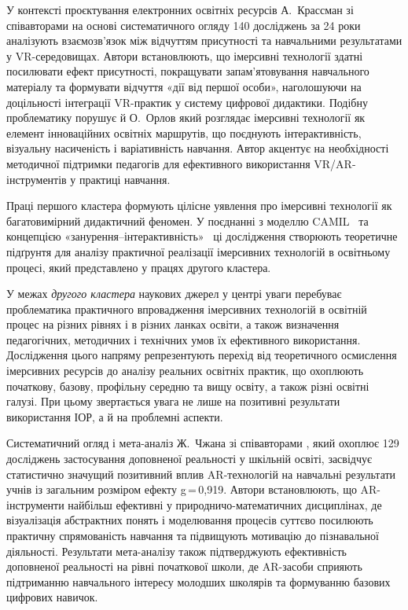 У контексті проєктування електронних освітніх ресурсів А.~Крассман зі співавторами \cite{Chornous2025Presence} на основі систематичного огляду 140 досліджень за 24 роки аналізують взаємозв'язок між відчуттям присутності та навчальними результатами у VR-середовищах. Автори встановлюють, що імерсивні технології здатні посилювати ефект присутності, покращувати запам'ятовування навчального матеріалу та формувати відчуття «дії від першої особи», наголошуючи на доцільності інтеграції VR-практик у систему цифрової дидактики. Подібну проблематику порушує й О.~Орлов \cite{Orlov2024Innovative} який розглядає імерсивні технології як елемент інноваційних освітніх маршрутів, що поєднують інтерактивність, візуальну насиченість і варіативність навчання. Автор акцентує на необхідності методичної підтримки педагогів для ефективного використання VR/AR-інструментів у практиці навчання.

Праці першого кластера формують цілісне уявлення про імерсивні технології як багатовимірний дидактичний феномен. У поєднанні з моделлю CAMIL~\cite{Makransky2021CAMIL} та концепцією «занурення--інтерактивність»~\cite{Klingenberg2024Embodiment} ці дослідження створюють теоретичне підґрунтя для аналізу практичної реалізації імерсивних технологій в освітньому процесі, який представлено у працях другого кластера.


У межах \emph{другого кластера} наукових джерел у центрі уваги перебуває проблематика практичного впровадження імерсивних технологій в освітній процес на різних рівнях і в різних ланках освіти, а також визначення педагогічних, методичних і технічних умов їх ефективного використання. Дослідження цього напряму репрезентують перехід від теоретичного осмислення імерсивних ресурсів до аналізу реальних освітніх практик, що охоплюють початкову, базову, профільну середню та вищу освіту, а також різні освітні галузі. При цьому звертається увага не лише на позитивні результати використання ІОР, а й на проблемні аспекти.

Систематичний огляд і мета-аналіз Ж.~Чжана зі співавторами \cite{Omelchuk2024Secondary}, який охоплює 129 досліджень застосування доповненої реальності у шкільній освіті, засвідчує статистично значущий позитивний вплив AR-технологій на навчальні результати учнів із загальним розміром ефекту g\,=\,0{,}919. Автори встановлюють, що AR-інструменти найбільш ефективні у природничо-математичних дисциплінах, де візуалізація абстрактних понять і моделювання процесів суттєво посилюють практичну спрямованість навчання та підвищують мотивацію до пізнавальної діяльності. Результати мета-аналізу також підтверджують ефективність доповненої реальності на рівні початкової школи, де AR-засоби сприяють підтриманню навчального інтересу молодших школярів та формуванню базових цифрових навичок.

